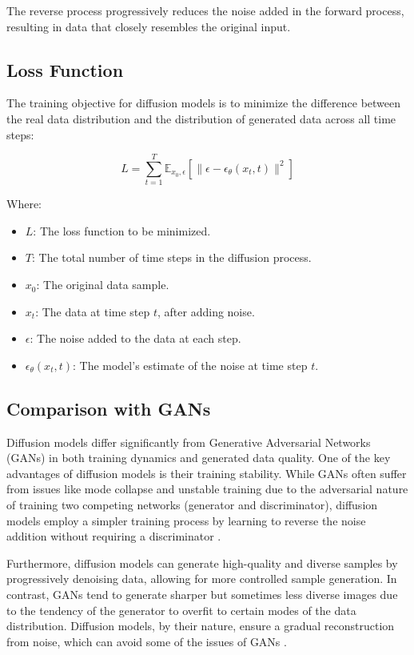 The reverse process progressively reduces the noise added in the forward process, resulting in data that closely resembles the original input.

\subsection{Loss Function}
The training objective for diffusion models is to minimize the difference between the real data distribution and the distribution of generated data across all time steps:

\begin{equation}
L = \sum_{t=1}^{T} \mathbb{E}_{x_0, \epsilon} [\|\epsilon - \epsilon_\theta(x_t, t)\|^2]
\end{equation}

Where:
\begin{itemize}
    \item \(L\): The loss function to be minimized.
    \item \(T\): The total number of time steps in the diffusion process.
    \item \(x_0\): The original data sample.
    \item \(x_t\): The data at time step \(t\), after adding noise.
    \item \(\epsilon\): The noise added to the data at each step.
    \item \(\epsilon_\theta(x_t, t)\): The model's estimate of the noise at time step \(t\).
\end{itemize}

\subsection{Comparison with GANs}

Diffusion models differ significantly from Generative Adversarial Networks (GANs) in both training dynamics and generated data quality. One of the key advantages of diffusion models is their training stability. While GANs often suffer from issues like mode collapse and unstable training due to the adversarial nature of training two competing networks (generator and discriminator), diffusion models employ a simpler training process by learning to reverse the noise addition without requiring a discriminator \citep{ho2020denoising}.

Furthermore, diffusion models can generate high-quality and diverse samples by progressively denoising data, allowing for more controlled sample generation. In contrast, GANs tend to generate sharper but sometimes less diverse images due to the tendency of the generator to overfit to certain modes of the data distribution. Diffusion models, by their nature, ensure a gradual reconstruction from noise, which can avoid some of the issues of GANs \citep{nichol2021improved}.

